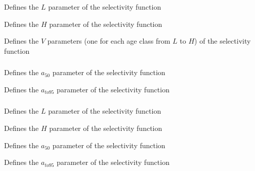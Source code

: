 \subsubsection[Increasing]{}

 {Defines the $L$ parameter of the selectivity function}

 {Defines the $H$ parameter of the selectivity function}

 {Defines the $V$ parameters (one for each age class from $L$ to $H$) of the selectivity function}

\subsubsection[Logistic]{}

 {Defines the $a_{50}$ parameter of the selectivity function}

 {Defines the $a_{to95}$ parameter of the selectivity function}

\subsubsection[Logistic producing]{}

 {Defines the $L$ parameter of the selectivity function}

 {Defines the $H$ parameter of the selectivity function}

 {Defines the $a_{50}$ parameter of the selectivity function}

 {Defines the $a_{to95}$ parameter of the selectivity function}

